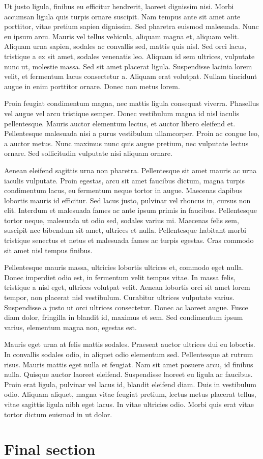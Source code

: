 \documentclass[11pt]{article}
\begin{document}
    Ut justo ligula, finibus eu efficitur hendrerit, laoreet dignissim nisi. Morbi accumsan ligula quis turpis ornare suscipit. Nam tempus ante sit amet ante porttitor, vitae pretium sapien dignissim. Sed pharetra euismod malesuada. Nunc eu ipsum arcu. Mauris vel tellus vehicula, aliquam magna et, aliquam velit. Aliquam urna sapien, sodales ac convallis sed, mattis quis nisl. Sed orci lacus, tristique a ex sit amet, sodales venenatis leo. Aliquam id sem ultrices, vulputate nunc ut, molestie massa. Sed sit amet placerat ligula. Suspendisse lacinia lorem velit, et fermentum lacus consectetur a. Aliquam erat volutpat. Nullam tincidunt augue in enim porttitor ornare. Donec non metus lorem.

    Proin feugiat condimentum magna, nec mattis ligula consequat viverra. Phasellus vel augue vel arcu tristique semper. Donec vestibulum magna id nisl iaculis pellentesque. Mauris auctor elementum lectus, et auctor libero eleifend et. Pellentesque malesuada nisi a purus vestibulum ullamcorper. Proin ac congue leo, a auctor metus. Nunc maximus nunc quis augue pretium, nec vulputate lectus ornare. Sed sollicitudin vulputate nisi aliquam ornare.

    Aenean eleifend sagittis urna non pharetra. Pellentesque sit amet mauris ac urna iaculis vulputate. Proin egestas, arcu sit amet faucibus dictum, magna turpis condimentum lacus, eu fermentum neque tortor in augue. Maecenas dapibus lobortis mauris id efficitur. Sed lacus justo, pulvinar vel rhoncus in, cursus non elit. Interdum et malesuada fames ac ante ipsum primis in faucibus. Pellentesque tortor neque, malesuada ut odio sed, sodales varius mi. Maecenas felis sem, suscipit nec bibendum sit amet, ultrices et nulla. Pellentesque habitant morbi tristique senectus et netus et malesuada fames ac turpis egestas. Cras commodo sit amet nisl tempus finibus.

    Pellentesque mauris massa, ultricies lobortis ultrices et, commodo eget nulla. Donec imperdiet odio est, in fermentum velit tempus vitae. In massa felis, tristique a nisl eget, ultrices volutpat velit. Aenean lobortis orci sit amet lorem tempor, non placerat nisl vestibulum. Curabitur ultrices vulputate varius. Suspendisse a justo ut orci ultrices consectetur. Donec ac laoreet augue. Fusce diam dolor, fringilla in blandit id, maximus et sem. Sed condimentum ipsum varius, elementum magna non, egestas est.

    Mauris eget urna at felis mattis sodales. Praesent auctor ultrices dui eu lobortis. In convallis sodales odio, in aliquet odio elementum sed. Pellentesque at rutrum risus. Mauris mattis eget nulla et feugiat. Nam sit amet posuere arcu, id finibus nulla. Quisque auctor laoreet eleifend. Suspendisse laoreet eu ligula ac faucibus. Proin erat ligula, pulvinar vel lacus id, blandit eleifend diam. Duis in vestibulum odio. Aliquam aliquet, magna vitae feugiat pretium, lectus metus placerat tellus, vitae sagittis ligula nibh eget lacus. In vitae ultricies odio. Morbi quis erat vitae tortor dictum euismod in ut dolor.

    \section{Final section}
\end{document}
